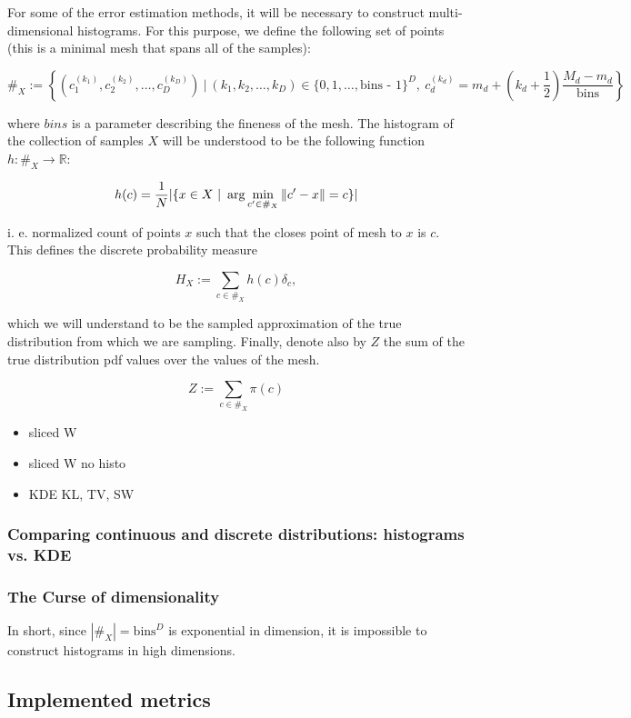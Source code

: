 For some of the error estimation methods, it will be necessary to construct multi-dimensional histograms. For this purpose, we define the following set of points (this is a minimal mesh that spans all of the samples):

$$
\#_X := \left\{ \left(c_1^{(k_1)}, c_2^{(k_2)}, \dots, c_D^{(k_D)}\right)\ |\ (k_1, k_2, \dots, k_D) \in \{0, 1, \dots, \text{bins - 1}\}^D, \ c_d^{(k_d)} = m_d + \left(k_d + \frac 1 2\right) \frac{M_d - m_d}{\text{bins}} \right\}
$$

where $bins$ is a parameter describing the fineness of the mesh. The histogram of the collection of samples $X$ will be understood to be the following function $h: \#_X \rightarrow \mathbb R$:

$$
    h(c) = \frac 1 N |\{x \in X\ |\ \arg \min_{c' \in \#_X} \norm{c' - x} = c \}|
$$

i. e. normalized count of points $x$ such that the closes point of mesh to $x$ is $c$. This defines the discrete probability measure 

$$H_X := \sum_{c \in \#_X} h(c) \delta_c,$$

which we will understand to be the sampled approximation of the true distribution from which we are sampling. Finally, denote also by $Z$ the sum of the true distribution pdf values over the values of the mesh.

\[Z := \sum_{c \in \#_X} \pi(c)\]

\begin{itemize}
    \item sliced W
    \item sliced W no histo
    \item KDE KL, TV, SW
\end{itemize}



\subsubsection{Comparing continuous and discrete distributions: histograms vs. KDE}


\subsubsection{The Curse of dimensionality}

In short, since $|\#_X| = \text{bins}^D$ is exponential in dimension, it is impossible to construct histograms in high dimensions.

\subsection{Implemented metrics}

